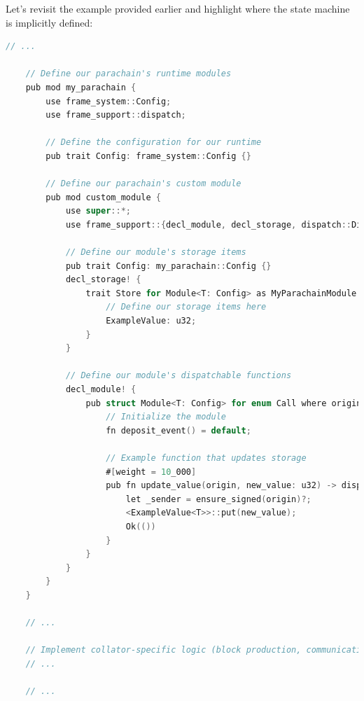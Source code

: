 \documentclass{tufte-handout}
\begin{document}
Let's revisit the example provided earlier and highlight where the state machine is implicitly defined:
\begin{lstlisting}[language=C, caption=State Machine]
    // ...

    // Define our parachain's runtime modules
    pub mod my_parachain {
        use frame_system::Config;
        use frame_support::dispatch;
        
        // Define the configuration for our runtime
        pub trait Config: frame_system::Config {}
        
        // Define our parachain's custom module
        pub mod custom_module {
            use super::*;
            use frame_support::{decl_module, decl_storage, dispatch::DispatchResult};
            
            // Define our module's storage items
            pub trait Config: my_parachain::Config {}
            decl_storage! {
                trait Store for Module<T: Config> as MyParachainModule {
                    // Define our storage items here
                    ExampleValue: u32;
                }
            }
            
            // Define our module's dispatchable functions
            decl_module! {
                pub struct Module<T: Config> for enum Call where origin: T::Origin {
                    // Initialize the module
                    fn deposit_event() = default;
                    
                    // Example function that updates storage
                    #[weight = 10_000]
                    pub fn update_value(origin, new_value: u32) -> dispatch::DispatchResult {
                        let _sender = ensure_signed(origin)?;
                        <ExampleValue<T>>::put(new_value);
                        Ok(())
                    }
                }
            }
        }
    }
    
    // ...
    
    // Implement collator-specific logic (block production, communication with relay chain, etc.)
    // ...
    
    // ...
    
    \end{lstlisting}
\end{document}
